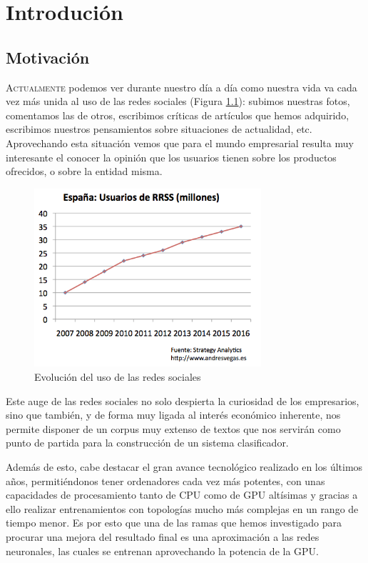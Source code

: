 \chapter{Introdución}
\label{chap:introducion}


\section{Motivación}
\lettrine{A}{ctualmente} podemos ver durante nuestro día a día como nuestra vida va cada vez más unida al uso de las redes sociales (Figura \ref{evorss}): subimos nuestras fotos, comentamos las de otros, escribimos críticas de artículos que hemos adquirido, escribimos nuestros pensamientos sobre situaciones de actualidad, etc. Aprovechando esta situación vemos que para el mundo empresarial resulta muy interesante el conocer la opinión que los usuarios tienen sobre los productos ofrecidos, o sobre la entidad misma.

\begin{figure}[!ht]
	\centering
	\includegraphics[width=0.75\textwidth]{imaxes/evorss.png}
	\caption{Evolución del uso de las redes sociales}
	\label{evorss}
\end{figure}

Este auge de las redes sociales no solo despierta la curiosidad de los empresarios, sino que también, y de forma muy ligada al interés económico inherente, nos permite disponer de un corpus muy extenso de textos que nos servirán como punto de partida para la construcción de un sistema clasificador.

Además de esto, cabe destacar el gran avance tecnológico realizado en los últimos años, permitiéndonos tener ordenadores cada vez más potentes, con unas capacidades de procesamiento tanto de CPU como de GPU altísimas y gracias a ello realizar entrenamientos con topologías mucho más complejas en un rango de tiempo menor. Es por esto que una de las ramas que hemos investigado para procurar una mejora del resultado final es una aproximación a las redes neuronales, las cuales se entrenan aprovechando la potencia de la GPU.

